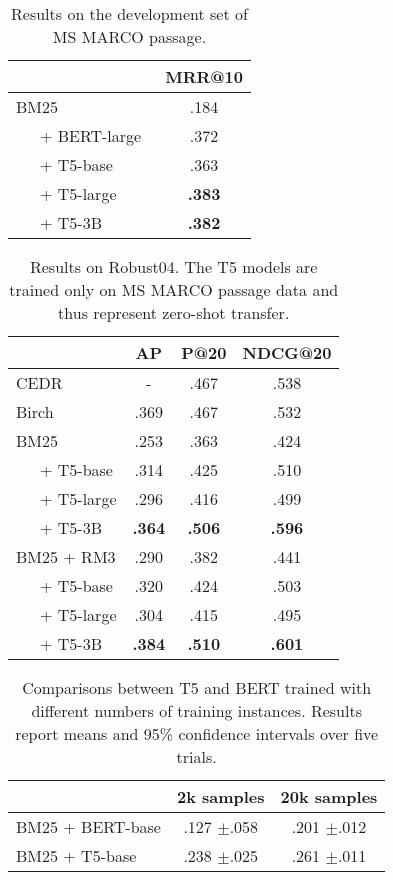 \documentclass{article}
\begin{document}
\begin{table}[t]
\begin{center}
\begin{tabular}{l|c}
& MRR@10 \\
\toprule
BM25 & .184 \\
\ \ \  + BERT-large~\cite{Nogueira_etal_arXiv2019_multistageBERT} & .372 \\
\ \ \  + T5-base & .363 \\
\ \ \  + T5-large & \textbf{.383} \\
\ \ \  + T5-3B & \textbf{.382} \\
\bottomrule
\end{tabular}
\vspace{2mm}
\caption{Results on the development set of MS MARCO passage.}
\label{tab:msmarco}
\end{center}
\end{table}

\begin{table}
\begin{center}
\begin{tabular}{l|ccc}
& AP & P@20 & NDCG@20\\
\toprule
CEDR~\cite{macavaney2019cedr} & - & .467 &  .538 \\
Birch~\cite{yilmaz2019cross} & .369 & .467 &  .532 \\
\midrule
BM25 & .253 & .363 & .424 \\
\ \ \  + T5-base & .314 & .425 & .510 \\
\ \ \  + T5-large & .296 & .416 & .499\\
\ \ \  + T5-3B & \textbf{.364} & \textbf{.506} & \textbf{.596}
\\
\midrule
BM25 + RM3 & .290 & .382 & .441 \\
\ \ \ + T5-base & .320 & .424 & .503 \\
\ \ \ + T5-large & .304	& .415 & .495 \\
\ \ \ + T5-3B & \textbf{.384} & \textbf{.510} & \textbf{.601} \\
\bottomrule
\end{tabular}
\end{center}
\vspace{2mm}
\caption{Results on Robust04. The T5 models are trained only on MS MARCO passage data and thus represent zero-shot transfer.}
\label{tab:robust04}
\end{table}

\begin{table}[t]
    \centering
    \begin{tabular}{l|c|c}
         &  2k samples & 20k samples \\
        \toprule
        BM25 + BERT-base & .127 $\pm${.058} & .201 $\pm${.012}\\
        BM25 + T5-base & .238 $\pm${.025} & .261 $\pm${.011}\\
        \bottomrule
    \end{tabular}
    \vspace{2mm}
    \caption{Comparisons between T5 and BERT trained with different numbers of training instances. Results report means and 95\% confidence intervals over five trials.}
    \label{tab:training_examples}
\end{table}
\end{document}
